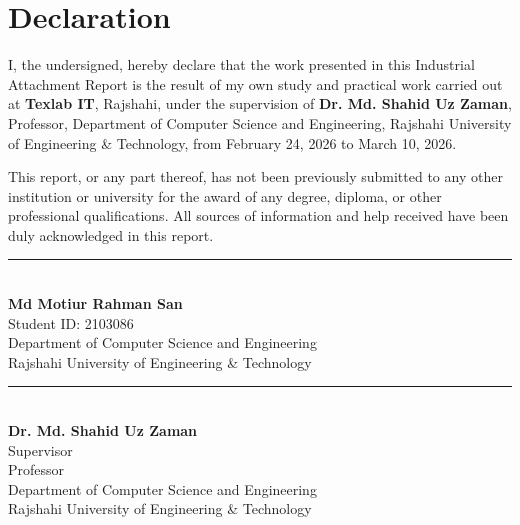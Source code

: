\chapter*{Declaration}

I, the undersigned, hereby declare that the work presented in this Industrial Attachment Report is the result of my own study and practical work carried out at \textbf{Texlab IT}, Rajshahi, under the supervision of \textbf{Dr. Md. Shahid Uz Zaman}, Professor, Department of Computer Science and Engineering, Rajshahi University of Engineering \& Technology, from February 24, 2026 to March 10, 2026.

This report, or any part thereof, has not been previously submitted to any other institution or university for the award of any degree, diploma, or other professional qualifications. All sources of information and help received have been duly acknowledged in this report.

\vspace{3cm}

\noindent
\begin{minipage}[t]{0.45\textwidth}
    \rule{\textwidth}{0.4pt} \\
    \textbf{Md Motiur Rahman San} \\
    Student ID: 2103086 \\
    Department of Computer Science and Engineering \\
    Rajshahi University of Engineering & Technology
\end{minipage}
\hfill
\begin{minipage}[t]{0.45\textwidth}
    \rule{\textwidth}{0.4pt} \\
    \textbf{Dr. Md. Shahid Uz Zaman} \\
    Supervisor \\
    Professor \\
    Department of Computer Science and Engineering \\
    Rajshahi University of Engineering \& Technology
\end{minipage}

